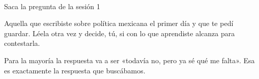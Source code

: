 \begin{frame}
  \vfill
  \begin{center}
    \\[1.3em]
    {\LARGE\color{verdeITAM} Saca la pregunta de la sesión 1}\\[1.5em]
    \begin{minipage}{0.80\textwidth}
      \centering\normalsize\color{grisTexto}
      Aquella que escribiste sobre política mexicana el primer día y que te
      pedí guardar. Léela otra vez y decide, tú, si con lo que aprendiste
      alcanza para contestarla.

      \vspace{0.8em}
      Para la mayoría la respuesta va a ser «todavía no, pero ya sé qué me
      falta». Esa es exactamente la respuesta que buscábamos.
    \end{minipage}
  \end{center}
  \vfill
\end{frame}


